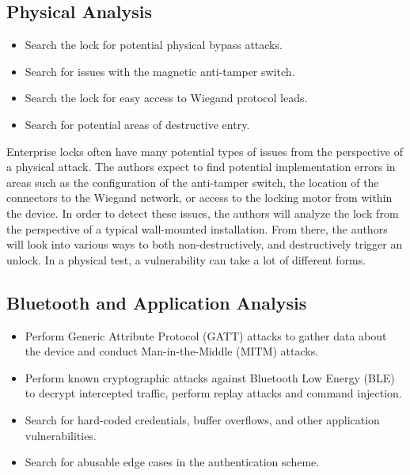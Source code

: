 \documentclass[10pt,twocolumn,letterpaper]{article}
\begin{document}
\subsection{Physical Analysis}
\begin{itemize}
    \item Search the lock for potential physical bypass attacks.
    \item Search for issues with the magnetic anti-tamper switch.
    \item Search the lock for easy access to Wiegand protocol leads.
    \item Search for potential areas of destructive entry.
\end{itemize}

Enterprise locks often have many potential types of issues from the perspective of a physical attack.  The authors expect to find potential implementation errors in areas such as the configuration of the anti-tamper switch, the location of the connectors to the Wiegand network, or access to the locking motor from within the device.  In order to detect these issues, the authors will analyze the lock from the perspective of a typical wall-mounted installation.  From there, the authors will look into various ways to both non-destructively, and destructively trigger an unlock.  In a physical test, a vulnerability can take a lot of different forms.  

\subsection{Bluetooth and Application Analysis}
\begin{itemize}
    \item Perform Generic Attribute Protocol (GATT) attacks to gather data about the device and conduct Man-in-the-Middle (MITM) attacks. 
    \item Perform known cryptographic attacks against Bluetooth Low Energy (BLE) to decrypt intercepted traffic, perform replay attacks and command injection.
    \item Search for hard-coded credentials, buffer overflows, and other application vulnerabilities. 
    \item Search for abusable edge cases in the authentication scheme.
\end{itemize}
\end{document}
